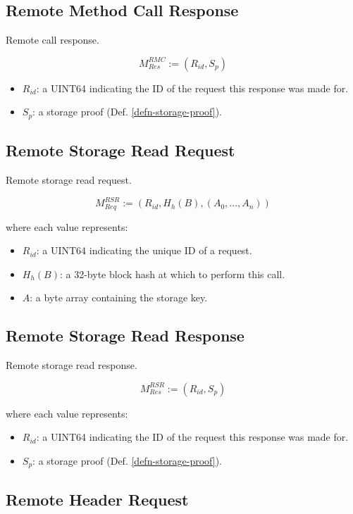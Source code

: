 \documentclass{book}
\begin{document}
\subsection{Remote Method Call Response}

Remote call response.

\[
    M^{RMC}_{Res} := (R_{id}, S_p)
\]

\begin{itemize}
    \item $R_{id}$: a UINT64 indicating the ID of the request this response was
    made for.
    \item $S_p$: a storage proof (Def. \ref{defn-storage-proof}).
\end{itemize}

\subsection{Remote Storage Read Request}

Remote storage read request.

\[
    M^{RSR}_{Req} := (R_{id}, H_h(B), (A_0, ..., A_n))
\]

where each value represents:

\begin{itemize}
    \item $R_{id}$: a UINT64 indicating the unique ID of a request.
    \item $H_h(B)$: a 32-byte block hash at which to perform this call.
    \item $A$: a byte array containing the storage key.
\end{itemize}

\subsection{Remote Storage Read Response}

Remote storage read response.

\[
    M^{RSR}_{Res} := (R_{id}, S_p)
\]

where each value represents:

\begin{itemize}
    \item $R_{id}$: a UINT64 indicating the ID of the request this response was
    made for.
    \item $S_p$: a storage proof (Def. \ref{defn-storage-proof}).
\end{itemize}

\subsection{Remote Header Request}
\end{document}
